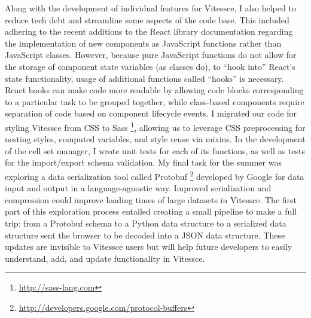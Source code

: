 \documentclass[12pt, letterpaper]{article}
\begin{document}
Along with the development of individual features for Vitessce, I also helped to reduce tech debt and streamline some aspects of the code base.
This included adhering to the recent additions to the React library documentation regarding the implementation of new components as JavaScript functions rather than JavaScript classes.
However, because pure JavaScript functions do not allow for the storage of component state variables (as classes do), to ``hook into'' React's state functionality, usage of additional functions called ``hooks'' is necessary.
React hooks can make code more readable by allowing code blocks corresponding to a particular task to be grouped together, while class-based components require separation of code based on component lifecycle events.
I migrated our code for styling Vitessce from CSS to Sass \footnote{\url{http://sass-lang.com}}, allowing us to leverage CSS preprocessing for nesting styles, computed variables, and style reuse via mixins.
In the development of the cell set manager, I wrote unit tests for each of its functions, as well as tests for the import/export schema validation.
My final task for the summer was exploring a data serialization tool called Protobuf \footnote{\url{http://developers.google.com/protocol-buffers}} developed by Google for data input and output in a language-agnostic way.
Improved serialization and compression could improve loading times of large datasets in Vitessce.
The first part of this exploration process entailed creating a small pipeline to make a full trip: from a Protobuf schema to a Python data structure to a serialized data structure sent the browser to be decoded into a JSON data structure.
These updates are invisible to Vitessce users but will help future developers to easily understand, add, and update functionality in Vitessce.
\end{document}

